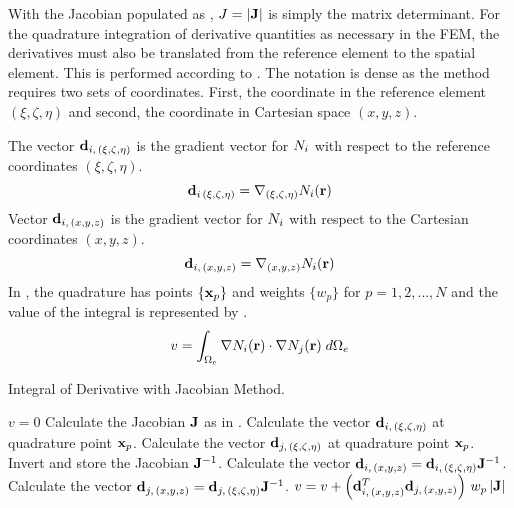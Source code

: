     With the Jacobian populated as , $J=\lvert\mathbf{J}\rvert$
    is simply the matrix determinant. For the quadrature integration of 
    derivative quantities as necessary in the FEM, the derivatives must also be
    translated from the reference element to the spatial element. This is 
    performed according to . The notation is 
    dense as the method requires two sets of coordinates. First, the coordinate 
    in the reference element $(\xi,\zeta,\eta)$ and second, the coordinate in 
    Cartesian space $(x,y,z)$.

    The vector $\mathbf{d}_{i,\,(\xi,\zeta,\eta)}$ is the gradient vector for
    $N_i$ with respect to the reference coordinates $(\xi,\zeta,\eta)$.
    \begin{equation}
      \mathbf{d}_{i\,(\xi,\zeta,\eta)} = \mathbf{\nabla}_{(\xi,\zeta,\eta)} N_i(\mathbf{r}) 
    \end{equation}
    Vector $\mathbf{d}_{i,\,(x,y,z)}$ is the gradient vector for $N_i$ with
    respect to the Cartesian coordinates $(x,y,z)$. 
    \begin{equation}
      \mathbf{d}_{i,\,(x,y,z)} = \mathbf{\nabla}_{(x,y,z)} N_i(\mathbf{r})
    \end{equation}
    In , the quadrature has points $\{\mathbf{x}_p\}$ 
    and weights $\{w_p\}$ for $p = 1,2,\ldots,N$ and the value of the integral
    is represented by .
    \begin{equation}
      \label{eq:deriv_integral}
      v = \int_{\Omega_e} \mathbf{\nabla} N_i(\mathbf{r}) \cdot \mathbf{\nabla} N_j(\mathbf{r}) \;
        d\Omega_e
    \end{equation}

    \begin{algorithm}
      \caption{Integral of Derivative with Jacobian Method.}
      \label{algorithm:deriv_int}
      \begin{algorithmic}[1]
        \State $v=0$
          \State Calculate the Jacobian $\mathbf{J}$ as in .
          \State Calculate the vector $\mathbf{d}_{i,\,(\xi,\zeta,\eta)}$ at quadrature
            point $\mathbf{x}_p$.
          \State Calculate the vector $\mathbf{d}_{j,\,(\xi,\zeta,\eta)}$ at quadrature
            point $\mathbf{x}_p$.
          \State Invert and store the Jacobian $\mathbf{J}^{-1}$.
          \State Calculate the vector $\mathbf{d}_{i,\,(x,y,z)} =
            \mathbf{d}_{i,\,(\xi,\zeta,\eta)} \mathbf{J}^{-1}$.
          \State Calculate the vector $\mathbf{d}_{j,\,(x,y,z)} =
            \mathbf{d}_{j,\,(\xi,\zeta,\eta)} \mathbf{J}^{-1}$.
          \State $v = v + \left(\mathbf{d}_{i,\,(x,y,z)}^{T} \mathbf{d}_{j,\,(x,y,z)}\right)
            \, w_p \, \lvert \mathbf{J} \rvert$
        \EndFor
      \end{algorithmic}
    \end{algorithm}

